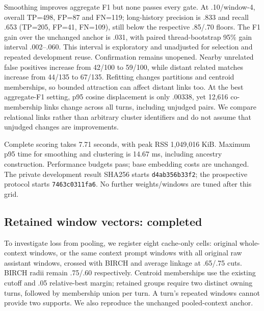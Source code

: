 \documentclass[11pt]{article}
\begin{document}
Smoothing improves aggregate F1 but none passes every gate. At .10/window-4,
overall TP=498, FP=87 and FN=119; long-history precision is .833 and recall .653
(TP=205, FP=41, FN=109), still below the respective .85/.70 floors.
The F1 gain over the unchanged anchor is .031, with paired thread-bootstrap
95\% gain interval .002--.060. This interval is exploratory and unadjusted
for selection and repeated development reuse. Confirmation remains unopened.
Nearby unrelated false positives increase from 42/100 to 59/100, while distant
related matches increase from 44/135 to 67/135. Refitting changes partitions
and centroid memberships, so bounded attraction can affect distant links too.
At the best aggregate-F1 setting, p95 cosine displacement is only .00338, yet
12,616 co-membership links change across all turns, including unjudged pairs.
We compare relational links rather than arbitrary cluster identifiers and do
not assume that unjudged changes are improvements.

Complete scoring takes 7.71 seconds, with peak RSS 1,049,016 KiB. Maximum p95
time for smoothing and clustering is 14.67 ms, including ancestry construction.
Performance budgets pass; base embedding costs are unchanged. The private
development result SHA256 starts \texttt{d4ab356b33f2}; the prospective protocol
starts \texttt{7463c0311fa6}. No further weights/windows are tuned after this grid.

\subsection{Retained window vectors: completed}
To investigate loss from pooling, we register eight cache-only cells: original
whole-context windows, or the same context prompt windows with all original raw
assistant windows, crossed with BIRCH and average linkage at .65/.75 cuts.
BIRCH radii remain .75/.60 respectively. Centroid memberships use the existing
cutoff and .05 relative-best margin; retained groups require two distinct owning
turns, followed by membership union per turn. A turn's repeated windows cannot
provide two supports. We also reproduce the unchanged pooled-context anchor.
\end{document}

